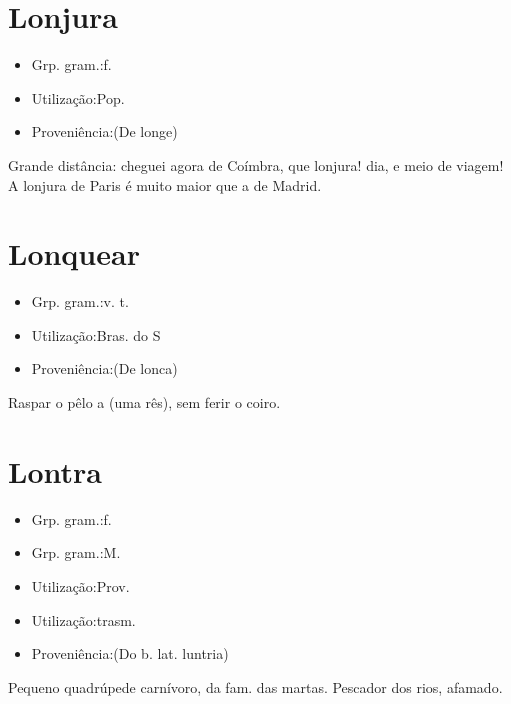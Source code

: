 \section{Lonjura}
\begin{itemize}
\item {Grp. gram.:f.}
\end{itemize}
\begin{itemize}
\item {Utilização:Pop.}
\end{itemize}
\begin{itemize}
\item {Proveniência:(De \textunderscore longe\textunderscore )}
\end{itemize}
Grande distância: \textunderscore cheguei agora de Coímbra, que lonjura! dia, e meio de viagem! A lonjura de Paris é muito maior que a de Madrid\textunderscore .
\section{Lonquear}
\begin{itemize}
\item {Grp. gram.:v. t.}
\end{itemize}
\begin{itemize}
\item {Utilização:Bras. do S}
\end{itemize}
\begin{itemize}
\item {Proveniência:(De \textunderscore lonca\textunderscore )}
\end{itemize}
Raspar o pêlo a (uma rês), sem ferir o coiro.
\section{Lontra}
\begin{itemize}
\item {Grp. gram.:f.}
\end{itemize}
\begin{itemize}
\item {Grp. gram.:M.}
\end{itemize}
\begin{itemize}
\item {Utilização:Prov.}
\end{itemize}
\begin{itemize}
\item {Utilização:trasm.}
\end{itemize}
\begin{itemize}
\item {Proveniência:(Do b. lat. \textunderscore luntria\textunderscore )}
\end{itemize}
Pequeno quadrúpede carnívoro, da fam. das martas.
Pescador dos rios, afamado.
